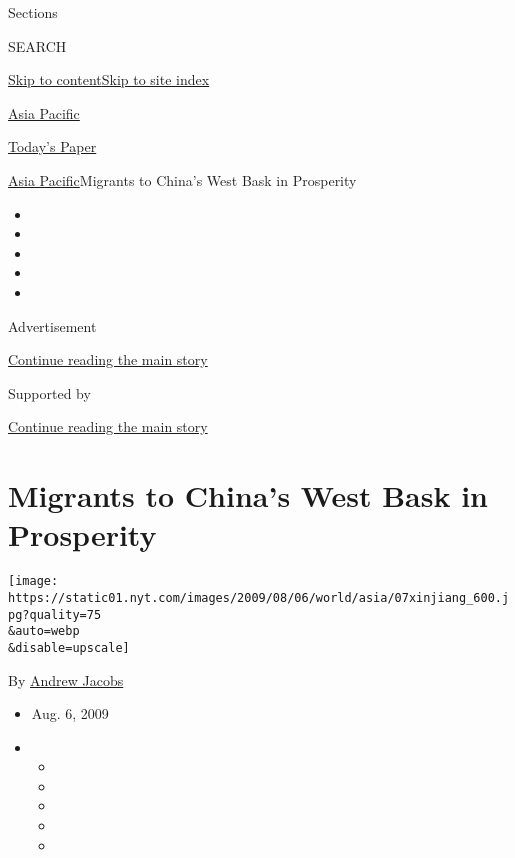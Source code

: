 Sections

SEARCH

\protect\hyperlink{site-content}{Skip to
content}\protect\hyperlink{site-index}{Skip to site index}

\href{https://www.nytimes.com/section/world/asia}{Asia Pacific}

\href{https://myaccount.nytimes.com/auth/login?response_type=cookie\&client_id=vi}{}

\href{https://www.nytimes.com/section/todayspaper}{Today's Paper}

\href{/section/world/asia}{Asia Pacific}\textbar{}Migrants to China's
West Bask in Prosperity

\begin{itemize}
\item
\item
\item
\item
\item
\end{itemize}

Advertisement

\protect\hyperlink{after-top}{Continue reading the main story}

Supported by

\protect\hyperlink{after-sponsor}{Continue reading the main story}

\hypertarget{migrants-to-chinas-west-bask-in-prosperity}{%
\section{Migrants to China's West Bask in
Prosperity}\label{migrants-to-chinas-west-bask-in-prosperity}}

\texttt{[image: https://static01.nyt.com/images/2009/08/06/world/asia/07xinjiang\_600.jpg?quality=75\\\&auto=webp\\\&disable=upscale]}

By \href{https://www.nytimes.com/by/andrew-jacobs}{Andrew Jacobs}

\begin{itemize}
\item
  Aug. 6, 2009
\item
  \begin{itemize}
  \item
  \item
  \item
  \item
  \item
  \end{itemize}
\end{itemize}

